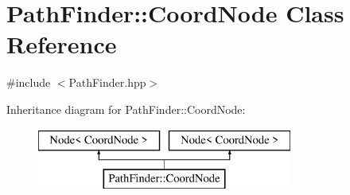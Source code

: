 \hypertarget{class_path_finder_1_1_coord_node}{}\section{Path\+Finder\+:\+:Coord\+Node Class Reference}
\label{class_path_finder_1_1_coord_node}


{\ttfamily \#include $<$Path\+Finder.\+hpp$>$}

Inheritance diagram for Path\+Finder\+:\+:Coord\+Node\+:\begin{figure}[H]
\begin{center}
\leavevmode
\includegraphics[height=2.000000cm]{class_path_finder_1_1_coord_node}
\end{center}
\end{figure}
